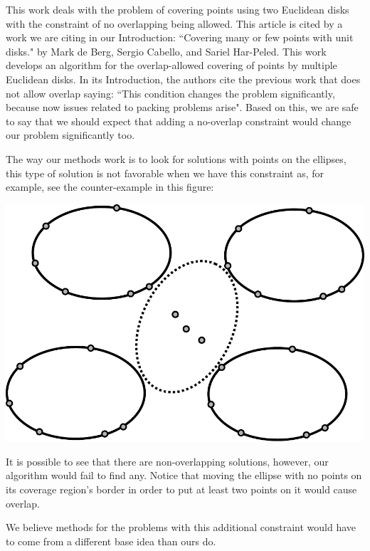 		This work deals with the problem of covering points using two Euclidean disks with the constraint of no overlapping being allowed. This article is cited by a work we are citing in our Introduction: ``Covering many or few points with unit disks." by Mark de Berg, Sergio Cabello, and Sariel Har-Peled. 
		This work develops an algorithm for the overlap-allowed covering of points by multiple Euclidean disks. In its Introduction, the authors cite the previous work that does not allow overlap saying: ``This condition changes the problem significantly, because now issues related to packing problems arise". 
		Based on this, we are safe to say that we should expect that adding a no-overlap constraint would change our problem significantly too.
		
		The way our methods work is to look for solutions with points on the ellipses, this type of solution is not favorable when we have this constraint as, for example, see the counter-example in this figure:  

		\includegraphics[scale=.6]{figures/answer-to-reviewer-2}

		It is possible to see that there are non-overlapping solutions, however, our algorithm would fail to find any. Notice that moving the ellipse with no points on its coverage region's border in order to put at least two points on it would cause overlap.
		
		We believe methods for the problems with this additional constraint would have to come from a different base idea than ours do.
		
		
